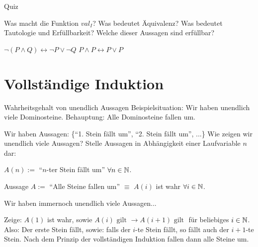 \documentclass{beamer}
\begin{document}

\begin{frame}
	\titlepage
\end{frame}


\begin{frame}{Quiz}
	\begin{itemize}
		\pitem Was macht die Funktion $val_I$?
		\pitem Was bedeutet Äquivalenz?
		\pitem Was bedeutet Tautologie und Erfüllbarkeit?
		\pitem Welche dieser Aussagen sind erfüllbar? %
		\begin{itemize}
			\pitem $\lnot (P \land Q) \leftrightarrow \lnot P \lor \lnot Q$
			\pitem $P \land P \leftrightarrow P \lor P$
		\end{itemize}
	\end{itemize}
\end{frame}

\section{Vollständige Induktion}
\begin{frame} {Wahrheitsgehalt von unendlich Aussagen}
	Beispielsituation: \p Wir haben unendlich viele Dominosteine. \p Behauptung: \p Alle Dominosteine fallen um.
	
	\begin{itemize}
		\pitem Wir haben Aussagen: \{``1. Stein fällt um'', ``2. Stein fällt um'', ...\}
		\pitem Wie zeigen wir unendlich viele Aussagen?
		\pitem Stelle Aussagen in Abhängigkeit einer Laufvariable $n$ dar:
		\begin{itemize}
			\pitem $A(n) := $ ``$n$-ter Stein fällt um'' $\forall n \in \mathbb{N}$.
		\end{itemize}
		\pitem Aussage $A := $ ``Alle Steine fallen um'' $\equiv$ $A(i)$ ist wahr $\forall i \in \mathbb{N}$.
	\end{itemize}

	\p Wir haben immernoch unendlich viele Aussagen...
	
	\begin{itemize}
		\pitem Zeige: $A(1)$ ist wahr\p , sowie $A(i)\text{ gilt } \rightarrow A(i+1)\text{ gilt }$ für beliebiges $i \in \mathbb{N}$.
		\pitem Also: \p Der erste Stein fällt, sowie: \p falls der $i$-te Stein fällt, so fällt auch der $i+1$-te Stein.
		\pitem Nach dem Prinzip der vollständigen Induktion fallen dann alle Steine um.
	\end{itemize}
\end{frame}
\end{document}
